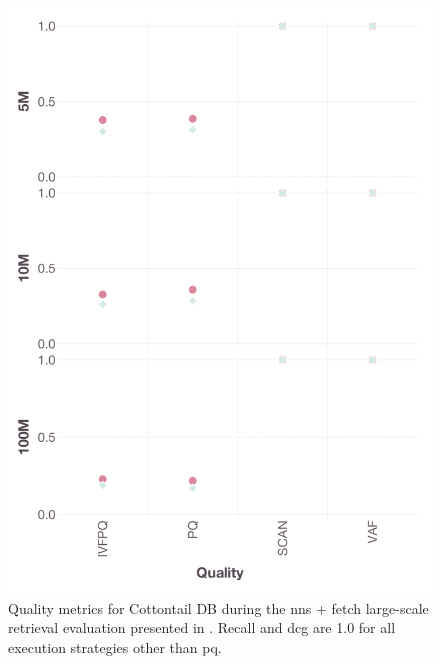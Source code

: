 \begin{figure}[p]
    \includegraphics[width=\linewidth]{figures/bignns-cottontail-NNS + Fetch-quality}
    \caption{Quality metrics for Cottontail DB during the \acrshort{nns} + fetch large-scale retrieval evaluation presented in . Recall and \acrshort{dcg} are 1.0 for all execution strategies other than \acrshort{pq}.}
\end{figure}


